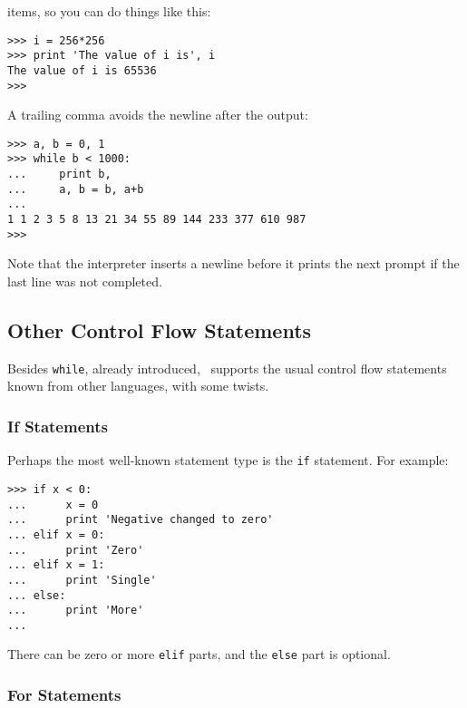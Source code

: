 \begin{itemize}
items, so you can do things like this:
\begin{code}\begin{verbatim}
>>> i = 256*256
>>> print 'The value of i is', i
The value of i is 65536
>>> 
\end{verbatim}\end{code}
A trailing comma avoids the newline after the output:
\begin{code}\begin{verbatim}
>>> a, b = 0, 1
>>> while b < 1000:
...     print b,
...     a, b = b, a+b
... 
1 1 2 3 5 8 13 21 34 55 89 144 233 377 610 987
>>> 
\end{verbatim}\end{code}
Note that the interpreter inserts a newline before it prints the next
prompt if the last line was not completed.
\end{itemize}

\subsection{Other Control Flow Statements}

Besides {\tt while}, already introduced, \Python\ supports the usual
control flow statements known from other languages, with some twists.

\subsubsection{If Statements}

Perhaps the most well-known statement type is the {\tt if} statement.
For example:
\begin{code}\begin{verbatim}
>>> if x < 0:
...      x = 0
...      print 'Negative changed to zero'
... elif x = 0:
...      print 'Zero'
... elif x = 1:
...      print 'Single'
... else:
...      print 'More'
... 
\end{verbatim}\end{code}
There can be zero or more {\tt elif} parts, and the {\tt else} part is
optional.

\subsubsection{For Statements}

